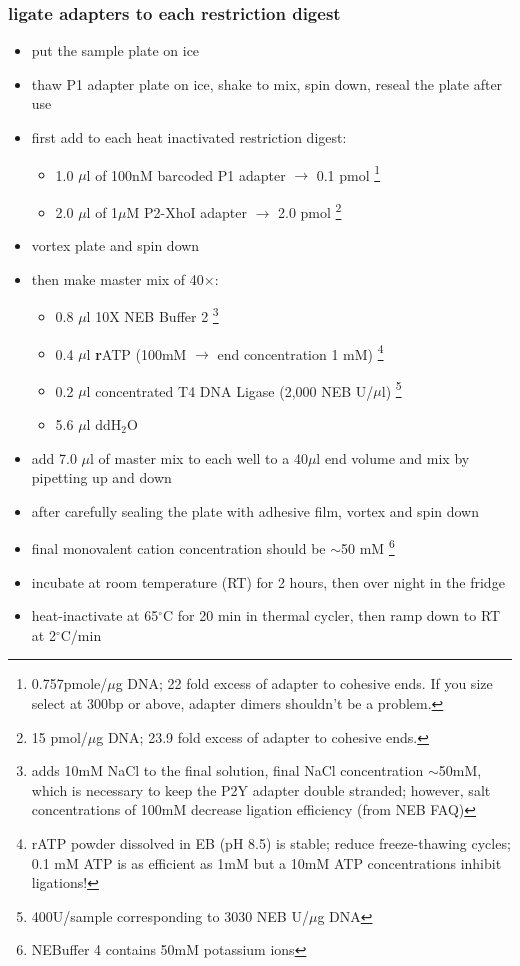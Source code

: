 \subsubsection
{ligate adapters to each restriction digest}
\begin{itemize}
\item put the sample plate on ice
\item thaw P1 adapter plate on ice, shake to mix, spin down, reseal the plate after use
\item first add to each heat inactivated restriction digest:
	\begin{itemize}
	\item 1.0 $\mu$l of 100nM barcoded P1 adapter $\rightarrow$ 0.1 pmol \footnote{0.757pmole/$\mu$g DNA; 22 fold excess of adapter to cohesive ends. If you size select at 300bp or above, adapter dimers shouldn't be a problem.}
	\item 2.0 $\mu$l of 1$\mu$M P2-XhoI adapter $\rightarrow$ 2.0 pmol \footnote{15 pmol/$\mu$g DNA; 23.9 fold excess of adapter to cohesive ends.}
	\end{itemize}
\item vortex plate and spin down
\item then make master mix of 40$\times$:
\begin{itemize}
\item 0.8 $\mu$l 10X NEB Buffer 2 \footnote{adds 10mM NaCl to the final solution, final NaCl concentration $\sim$50mM, which is necessary to keep the P2Y adapter double stranded; however, salt concentrations of 100mM decrease ligation efficiency (from NEB FAQ)}
\item 0.4 $\mu$l \textbf{r}ATP (100mM $\rightarrow$ end concentration 1 mM) \footnote{rATP powder dissolved in EB (pH 8.5) is stable; reduce freeze-thawing cycles;  0.1 mM ATP is as efficient as 1mM but a 10mM ATP concentrations inhibit ligations!}
\item 0.2 $\mu$l concentrated T4 DNA Ligase (2,000 NEB U/$\mu$l) \footnote{400U/sample corresponding to 3030 NEB U/$\mu$g DNA}
\item 5.6 $\mu$l ddH$_{2}$O
\end{itemize}
\item add 7.0 $\mu$l of master mix to each well to a 40$\mu$l end volume and mix by pipetting up and down
\item after carefully sealing the plate with adhesive film, vortex and spin down
\item final monovalent cation concentration should be $\sim$50 mM \footnote{NEBuffer 4 contains 50mM potassium ions}
\item incubate at room temperature (RT) for 2 hours, then over night in the fridge
\item heat-inactivate at 65$^{\circ}$C for 20 min in thermal cycler, then ramp down to RT at 2$^{\circ}$C/min
\end{itemize}

